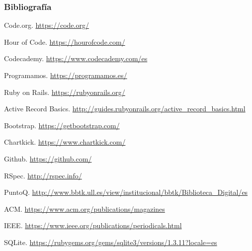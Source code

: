 \documentclass{beamer}
\begin{document}
\begin{frame}[allowframebreaks]
  \frametitle{Bibliografía}

  \begin{thebibliography}{10}

    \beamertemplatebookbibitems
    Code.org. {\small{\url{https://code.org/}}}

    \beamertemplatebookbibitems
    Hour of Code. {\small{\url{https://hourofcode.com/}}}

    \beamertemplatebookbibitems
    Codecademy. {\small{\url{https://www.codecademy.com/es}}}

    \beamertemplatebookbibitems
    Programamos. {\small{\url{https://programamos.es/}}}

    \beamertemplatebookbibitems
    Ruby on Rails. {\small{\url{https://rubyonrails.org/}}}

    \beamertemplatebookbibitems
    Active Record Basics. {\small{\url{http://guides.rubyonrails.org/active_record_basics.html}}}

    \beamertemplatebookbibitems
    Bootstrap. {\small{\url{https://getbootstrap.com/}}}

    \beamertemplatebookbibitems
    Chartkick. {\small{\url{https://www.chartkick.com/}}}

    \beamertemplatebookbibitems
    Github. {\small{\url{https://github.com/}}}

    \beamertemplatebookbibitems
    RSpec. {\small{\url{http://rspec.info/}}}

    \beamertemplatebookbibitems
    PuntoQ. {\small{\url{http://www.bbtk.ull.es/view/institucional/bbtk/Biblioteca_Digital/es}}}

    \beamertemplatebookbibitems
    ACM. {\small{\url{https://www.acm.org/publications/magazines}}}

    \beamertemplatebookbibitems
    IEEE. {\small{\url{https://www.ieee.org/publications/periodicals.html}}}

    \beamertemplatebookbibitems
    SQLite. {\small{\url{https://rubygems.org/gems/sqlite3/versions/1.3.11?locale=es}}}


\end{thebibliography}
\end{frame}
\end{document}
